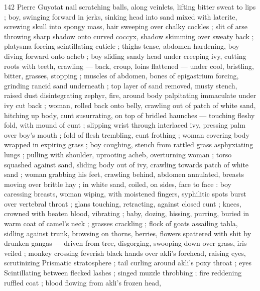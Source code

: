 142 Pierre Guyotat
nail scratching balls, along veinlets, lifting bitter sweat to lips ; boy,
swinging forward in jerks, sinking head into sand mixed with laterite,
screwing skull into spongy mass, hair sweeping over chalky cockles
; slit of arse throwing sharp shadow onto curved coccyx, shadow
skimming over sweaty back ; platysma forcing scintillating cuticle ;
thighs tense, abdomen hardening, boy diving forward onto acheb ;
boy sliding sandy head under creeping ivy, cutting roots with teeth,
crawling — back, croup, loins flattened — under cool, bristling,
bitter, grasses, stopping ; muscles of abdomen, bones of
epigastrium forcing, grinding rancid sand underneath ; top layer of
sand removed, musty stench, raised dust disintegrating zephyr, fire,
around body palpitating immaculate under ivy cut back ; woman,
rolled back onto belly, crawling out of patch of white sand, hitching
up body, cunt susurrating, on top of bridled haunches — touching
fleshy fold, with mound of cunt ; slipping wrist through interlaced ivy,
pressing palm over boy's mouth ; fold of flesh trembling, cunt
frothing ; woman covering body wrapped in expiring grass ; boy
coughing, stench from rattled grass asphyxiating lungs ; pulling with
shoulder, uprooting acheb, overturning woman ; torso squashed
against sand, sliding body out of ivy, crawling towards patch of white
sand ; woman grabbing his feet, crawling behind, abdomen
annulated, breasts moving over brittle hay ; in white sand, coiled, on
sides, face to face : boy caressing breasts, woman wiping, with
moistened fingers, syphilitic spots burst over vertebral throat ; glans
touching, retracting, against closed cunt ; knees, crowned with
beaten blood, vibrating ; baby, dozing, hissing, purring, buried in
warm coat of camel's neck ; grasses crackling ; flock of goats
assailing tahla, sidling against trunk, browsing on thorns, berries,
flowers spattered with shit by drunken gangas — driven from tree,
disgorging, swooping down over grass, iris veiled ; monkey crossing
feverish black hands over akli’s forehead, raising eyes, scrutinizing
Prismatic stratosphere ; tail curling around akli's poxy throat ; eyes
Scintillating between flecked lashes ; singed muzzle throbbing ; fire
reddening ruffled coat ; blood flowing from akli’s frozen head,

